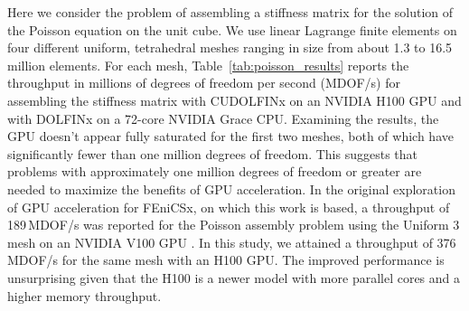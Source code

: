 Here we consider the problem of assembling a stiffness matrix for the solution of the Poisson equation on the unit cube. We use linear Lagrange finite elements on four different uniform, tetrahedral meshes ranging in size from about 1.3 to 16.5 million elements.  For each mesh, Table~\ref{tab:poisson_results} reports the throughput in millions of degrees of freedom per second (MDOF/s) for assembling the stiffness matrix with CUDOLFINx on an NVIDIA H100 GPU and with DOLFINx on a 72-core NVIDIA Grace CPU. Examining the results, the GPU doesn't appear fully saturated for the first two meshes, both of which have significantly fewer than one million degrees of freedom. This suggests that problems with approximately one million degrees of freedom or greater are needed to maximize the benefits of GPU acceleration. In the original exploration of GPU acceleration for FEniCSx, on which this work is based, a throughput of 189\,MDOF/s was reported for the Poisson assembly problem using the Uniform 3 mesh on an NVIDIA V100 GPU \citep{trotter2023targeting}. In this study, we attained a throughput of 376\,MDOF/s for the same mesh with an H100 GPU. The improved performance is unsurprising given that the H100 is a newer model with more parallel cores and a higher memory throughput.


